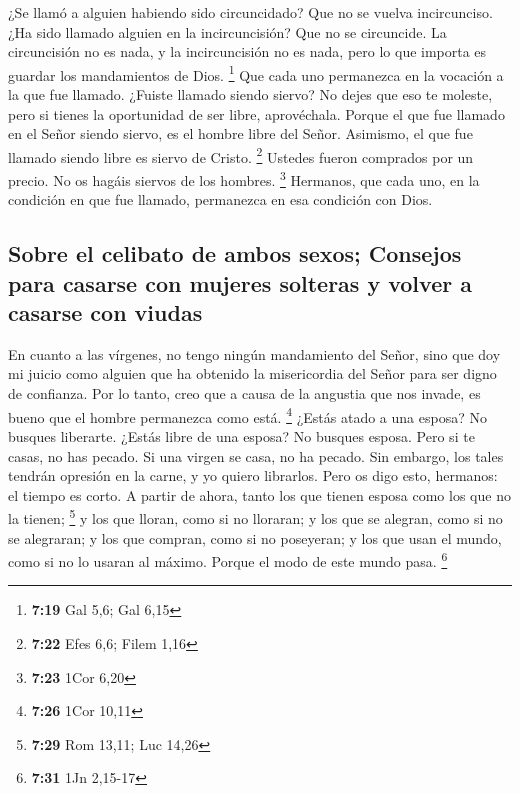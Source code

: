 \begin{paracol}{2}
 ¿Se llamó a alguien habiendo sido circuncidado? Que no
se vuelva incircunciso. ¿Ha sido llamado alguien en la incircuncisión?
Que no se circuncide.  La circuncisión no es nada, y la
incircuncisión no es nada, pero lo que importa es guardar los
mandamientos de Dios. \footnote{\textbf{7:19} Gal 5,6; Gal 6,15}
 Que cada uno permanezca en la vocación a la que fue
llamado.  ¿Fuiste llamado siendo siervo? No dejes que eso
te moleste, pero si tienes la oportunidad de ser libre, aprovéchala.
 Porque el que fue llamado en el Señor siendo siervo, es
el hombre libre del Señor. Asimismo, el que fue llamado siendo libre es
siervo de Cristo. \footnote{\textbf{7:22} Efes 6,6; Filem 1,16}
 Ustedes fueron comprados por un precio. No os hagáis
siervos de los hombres. \footnote{\textbf{7:23} 1Cor 6,20}
 Hermanos, que cada uno, en la condición en que fue
llamado, permanezca en esa condición con Dios.

\hypertarget{sobre-el-celibato-de-ambos-sexos-consejos-para-casarse-con-mujeres-solteras-y-volver-a-casarse-con-viudas}{%
\subsection{Sobre el celibato de ambos sexos; Consejos para casarse con
mujeres solteras y volver a casarse con
viudas}\label{sobre-el-celibato-de-ambos-sexos-consejos-para-casarse-con-mujeres-solteras-y-volver-a-casarse-con-viudas}}

 En cuanto a las vírgenes, no tengo ningún mandamiento
del Señor, sino que doy mi juicio como alguien que ha obtenido la
misericordia del Señor para ser digno de confianza.  Por
lo tanto, creo que a causa de la angustia que nos invade, es bueno que
el hombre permanezca como está. \footnote{\textbf{7:26} 1Cor 10,11}
 ¿Estás atado a una esposa? No busques liberarte. ¿Estás
libre de una esposa? No busques esposa.  Pero si te
casas, no has pecado. Si una virgen se casa, no ha pecado. Sin embargo,
los tales tendrán opresión en la carne, y yo quiero librarlos.
 Pero os digo esto, hermanos: el tiempo es corto. A
partir de ahora, tanto los que tienen esposa como los que no la tienen;
\footnote{\textbf{7:29} Rom 13,11; Luc 14,26}  y los que
lloran, como si no lloraran; y los que se alegran, como si no se
alegraran; y los que compran, como si no poseyeran;  y
los que usan el mundo, como si no lo usaran al máximo. Porque el modo de
este mundo pasa. \footnote{\textbf{7:31} 1Jn 2,15-17}


\end{paracol}
